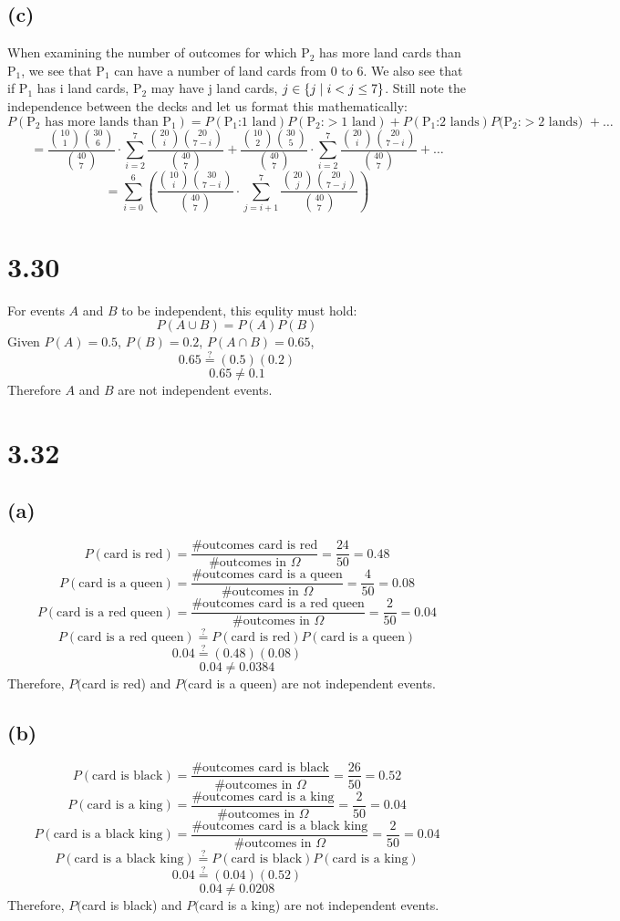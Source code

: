 \documentclass[11pt]{article}
\begin{document}
\subsection*{(c)}
When examining the number of outcomes for which P$_2$ has more land cards than P$_1$, we see that P$_1$ can have a number of land cards from 0 to 6. We also see that if P$_1$ has i land cards, P$_2$ may have j land cards, $j\in\{j\hspace{1mm}|\hspace{1mm}i<j\leq7\}$. Still note the independence between the decks and let us format this mathematically:
\[P(\text{P}_2\text{ has more lands than P}_1)=P(\text{P}_1\text{:1 land})P(\text{P}_2\text{:}>\text{1 land})+P(\text{P}_1\text{:2 lands})P(\text{P}_2\text{:}>\text{2 lands) }+\ldots\]
\[=\frac{\binom{10}{1}\binom{30}{6}}{\binom{40}{7}}\cdot\sum_{i=2}^7{\frac{\binom{20}{i}\binom{20}{7-i}}{\binom{40}{7}}}+\frac{\binom{10}{2}\binom{30}{5}}{\binom{40}{7}}\cdot\sum_{i=2}^7{\frac{\binom{20}{i}\binom{20}{7-i}}{\binom{40}{7}}}+\ldots\]
\[=\sum_{i=0}^6{\left(\frac{\binom{10}{i}\binom{30}{7-i}}{\binom{40}{7}}\cdot\sum_{j=i+1}^7{\frac{\binom{20}{j}\binom{20}{7-j}}{\binom{40}{7}}}\right)}\]
\section*{3.30}
For events $A$ and $B$ to be independent, this equlity must hold:
\[P(A\cup B)=P(A)P(B)\]
Given $P(A)=0.5$, $P(B)=0.2$, $P(A\cap B)=0.65$,
\[0.65\stackrel{?}{=}(0.5)(0.2)\]
\[0.65\neq 0.1\]
Therefore $A$ and $B$ are not independent events.
\section*{3.32}
\subsection*{(a)}
\[P(\text{card is red})=\frac{\text{\# outcomes card is red}}{\text{\# outcomes in }\Omega}=\frac{24}{50}=0.48\]
\[P(\text{card is a queen})=\frac{\text{\# outcomes card is a queen}}{\text{\# outcomes in }\Omega}=\frac{4}{50}=0.08\]
\[P(\text{card is a red queen})=\frac{\text{\# outcomes card is a red queen}}{\text{\# outcomes in }\Omega}=\frac{2}{50}=0.04\]
\[P(\text{card is a red queen})\stackrel{?}{=}P(\text{card is red})P(\text{card is a queen})\]
\[0.04\stackrel{?}{=}(0.48)(0.08)\]
\[0.04\neq 0.0384\]
Therefore, $P($card is red) and $P($card is a queen) are not independent events.
\subsection*{(b)}
\[P(\text{card is black})=\frac{\text{\# outcomes card is black}}{\text{\# outcomes in }\Omega}=\frac{26}{50}=0.52\]
\[P(\text{card is a king})=\frac{\text{\# outcomes card is a king}}{\text{\# outcomes in }\Omega}=\frac{2}{50}=0.04\]
\[P(\text{card is a black king})=\frac{\text{\# outcomes card is a black king}}{\text{\# outcomes in }\Omega}=\frac{2}{50}=0.04\]
\[P(\text{card is a black king})\stackrel{?}{=}P(\text{card is black})P(\text{card is a king})\]
\[0.04\stackrel{?}{=}(0.04)(0.52)\]
\[0.04\neq 0.0208\]
Therefore, $P($card is black) and $P($card is a king) are not independent events.
\end{document}
